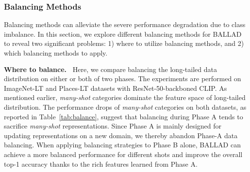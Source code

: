 \documentclass[10pt,twocolumn,letterpaper]{article}
\newcommand{\approach}{\textsc{BALLAD}}
\begin{document}
\vspace*{-13pt}

\subsubsection{Balancing Methods}
Balancing methods can alleviate the severe performance degradation due to class imbalance. 
In this section, we explore different balancing methods for \approach{} to reveal two significant problems: 1) where to utilize balancing methods, and 2) which balancing methods to apply. 


\noindent\textbf{Where to balance.~}
Here, we compare balancing the long-tailed data distribution on either or both of two phases.
The experiments are performed on ImageNet-LT and Places-LT datasets with ResNet-50-backboned CLIP.
As mentioned earlier, \textit{many-shot} categories dominate the feature space of long-tailed distribution. The performance drops of \textit{many-shot} categories on both datasets, as reported in Table~\ref{tab:balance}, suggest that balancing during Phase A tends to sacrifice \textit{many-shot} representations. Since Phase A is mainly designed for updating representations on a new domain, we thereby abandon Phase-A data balancing.
When applying balancing strategies to Phase B alone, \approach{} can achieve a more balanced performance for different shots and improve the overall top-1 accuracy thanks to the rich features learned from Phase A.
\end{document}

